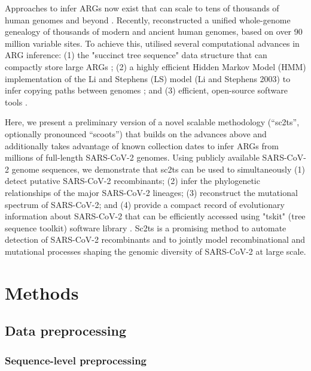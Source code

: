\documentclass{article}
\begin{document}
Approaches to infer ARGs now exist that can scale to tens of thousands of human
genomes and beyond
\citep{Speidel2019-yh,Kelleher2019-ba,Zhang2021-lf,Schaefer2021-yg}. Recently,
\cite{Wohns2022-th} reconstructed a unified whole-genome genealogy
of thousands of modern and ancient human genomes, based on over 90 million
variable sites. To achieve this, \cite{Wohns2022-th} utilised
several computational advances in ARG inference: (1) the "succinct tree
sequence" data structure that can compactly store large ARGs
\citep{Kelleher2018-xc}; (2) a highly efficient Hidden Markov Model (HMM)
implementation of the Li and Stephens (LS) model (Li and Stephens 2003) to
infer copying paths between genomes \citep{Kelleher2019-ba}; and (3) efficient,
open-source software tools
\citep{Baumdicker2022-ep,Kelleher2018-xc,Kelleher2019-ba,Wohns2022-th}.

Here, we present a preliminary version of a novel scalable methodology
(``sc2ts'', optionally pronounced ``scoots'') that builds on the advances above and
additionally takes advantage of known collection dates to infer ARGs from
millions of full-length SARS-CoV-2 genomes. Using publicly available SARS-CoV-2
genome sequences, we demonstrate that sc2ts can be used to simultaneously (1)
detect putative SARS-CoV-2 recombinants; (2) infer the phylogenetic
relationships of the major SARS-CoV-2 lineages; (3) reconstruct the mutational
spectrum of SARS-CoV-2; and (4) provide a compact record of evolutionary
information about SARS-CoV-2 that can be efficiently accessed using "tskit"
(tree sequence toolkit) software library \citep{Kelleher2018-xc}. Sc2ts is a
promising method to automate detection of SARS-CoV-2 recombinants and to
jointly model recombinational and mutational processes shaping the genomic
diversity of SARS-CoV-2 at large scale.

\section{Methods}

\subsection{Data preprocessing}

\subsubsection{Sequence-level preprocessing}
\end{document}
